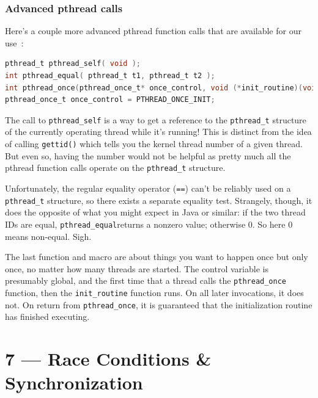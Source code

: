 \documentclass[a4paper]{report}
\begin{document}
\subsection*{Advanced pthread calls} Here's a couple more advanced pthread function calls that are available for our use~\cite{pthreads}:

\begin{lstlisting}[language=C]
pthread_t pthread_self( void );
int pthread_equal( pthread_t t1, pthread_t t2 );
int pthread_once(pthread_once_t* once_control, void (*init_routine)(void));
pthread_once_t once_control = PTHREAD_ONCE_INIT;
\end{lstlisting}

The call to \texttt{pthread\_self} is a way to get a reference to the \texttt{pthread\_t} structure of the currently operating thread while it's running! This is distinct from the idea of calling \texttt{gettid()} which tells you the kernel thread number of a given thread. But even so, having the number would not be helpful as pretty much all the pthread function calls operate on the \texttt{pthread\_t} structure.

Unfortunately, the regular equality operator (\texttt{==}) can't be reliably used on a \texttt{pthread\_t} structure, so there exists a separate equality test. Strangely, though, it does the opposite of what you might expect in Java or similar: if the two thread IDs are equal, \texttt{pthread\_equal}returns a nonzero value; otherwise 0. So here 0 means non-equal. Sigh.

The last function and macro are about things you want to happen once but only once, no matter how many threads are started. The control variable is presumably global, and the first time that a thread calls the \texttt{pthread\_once} function, then the \texttt{init\_routine} function runs. On all later invocations, it does not. On return from \texttt{pthread\_once}, it is guaranteed that the initialization routine has finished executing.









\chapter*{7 --- Race Conditions \& Synchronization}

\end{document}
